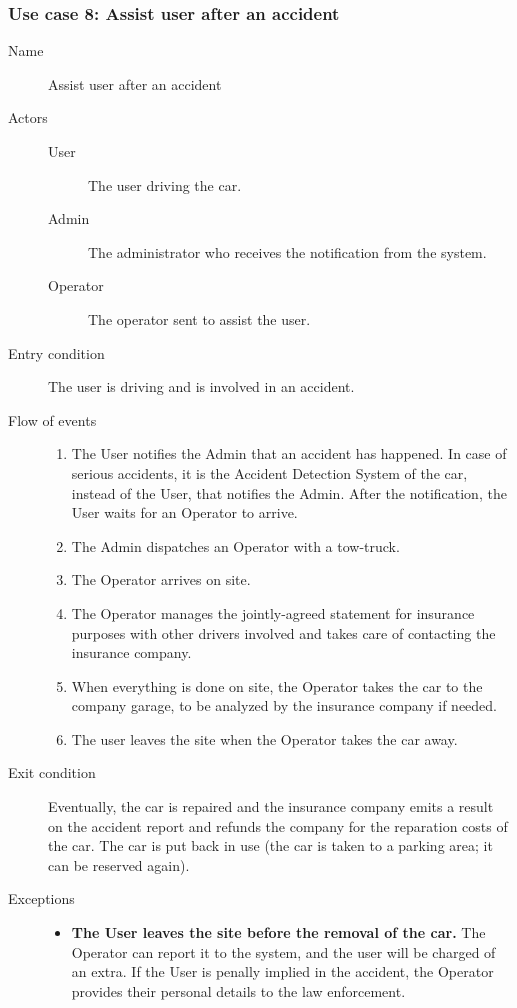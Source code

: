 	\subsubsection{Use case 8: Assist user after an accident}
		\begin{description}
			\item[Name] Assist user after an accident
			\item[Actors] \hfill
			\begin{description}
				\item[User] The user driving the car.
				\item[Admin] The administrator who receives the notification from the system.
				\item[Operator] The operator sent to assist the user.
			\end{description}
			\item[Entry condition] The user is driving and is involved in an accident.
			\item[Flow of events] \hfill
			\begin{enumerate}
				\item The User notifies the Admin that an accident has happened. In case of serious accidents, it is the Accident Detection System of the car, instead of the User, that notifies the Admin. After the notification, the User waits for an Operator to arrive.
				\item The Admin dispatches an Operator with a tow-truck.
				\item The Operator arrives on site.
				\item The Operator manages the jointly-agreed statement for insurance purposes with other drivers involved and takes care of contacting the insurance company.
				\item When everything is done on site, the Operator takes the car to the company garage, to be analyzed by the insurance company if needed.
				\item The user leaves the site when the Operator takes the car away.
			\end{enumerate}
			\item[Exit condition] Eventually, the car is repaired and the insurance company emits a result on the accident report and refunds the company for the reparation costs of the car. The car is put back in use (the car is taken to a parking area; it can be reserved again).
			\item[Exceptions] \hfill
			\begin{itemize}
				\item \textbf{The User leaves the site before the removal of the car.} The Operator can report it to the system, and the user will be charged of an extra. If the User is penally implied in the accident, the Operator provides their personal details to the law enforcement.

\end{itemize}
\end{description}
